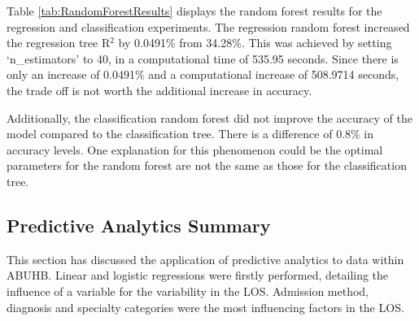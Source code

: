 \documentclass[../thesis.tex]{subfiles}
\begin{document}
\begin{table}[h!]
    \centering{}
    \caption{The accuracy and $R^{2}$ score for the regression and classification random forest models, measured against the n$\_$estimator parameter, respectively. Each model's computational runtime was additionally provided.}
    \label{tab:RandomForestResults}
\end{table}

Table \ref{tab:RandomForestResults} displays the random forest results for the regression and classification experiments. The regression random forest increased the regression tree R$^{2}$ by 0.0491\% from 34.28\%. This was achieved by setting `n\_estimators' to 40, in a computational time of 535.95 seconds. Since there is only an increase of 0.0491\% and a computational increase of 508.9714 seconds, the trade off is not worth the additional increase in accuracy.

Additionally, the classification random forest did not improve the accuracy of the model compared to the classification tree. There is a difference of 0.8\% in accuracy levels. One explanation for this phenomenon could be the optimal parameters for the random forest are not the same as those for the classification tree. 

\subsection{Predictive Analytics Summary}
This section has discussed the application of predictive analytics to data within ABUHB. Linear and logistic regressions were firstly performed, detailing the influence of a variable for the variability in the LOS. Admission method, diagnosis and specialty categories were the most influencing factors in the LOS.
\end{document}

